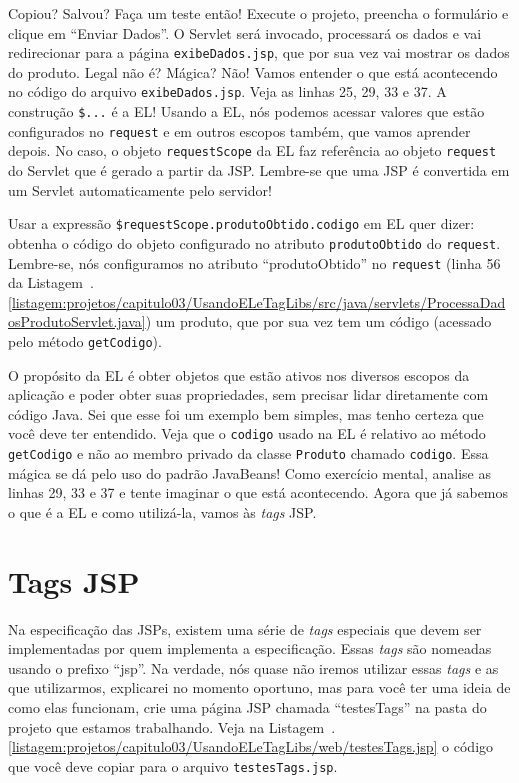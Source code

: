 
Copiou? Salvou? Faça um teste então! Execute o projeto, preencha o formulário e clique em ``Enviar Dados''. O Servlet será invocado, processará os dados e vai redirecionar para a página \texttt{exibeDados.jsp}, que por sua vez vai mostrar os dados do produto. Legal não é? Mágica? Não! Vamos entender o que está acontecendo no código do arquivo \texttt{exibeDados.jsp}. Veja as linhas 25, 29, 33 e 37. A construção \texttt{\${...}} é a EL! Usando a EL, nós podemos acessar valores que estão configurados no \texttt{request} e em outros escopos também, que vamos aprender depois. No caso, o objeto \texttt{requestScope} da EL faz referência ao objeto \texttt{request} do Servlet que é gerado a partir da JSP. Lembre-se que uma JSP é convertida em um Servlet automaticamente pelo servidor!

Usar a expressão \texttt{\${requestScope.produtoObtido.codigo}} em EL quer dizer: obtenha o código do objeto configurado no atributo \texttt{produtoObtido} do \texttt{request}. Lembre-se, nós configuramos no atributo ``produtoObtido'' no \texttt{request} (linha 56 da Listagem~\thechapter.\ref{listagem:projetos/capitulo03/UsandoELeTagLibs/src/java/servlets/ProcessaDadosProdutoServlet.java}) um produto, que por sua vez tem um código (acessado pelo método \texttt{getCodigo}).

O propósito da EL é obter objetos que estão ativos nos diversos escopos da aplicação e poder obter suas propriedades, sem precisar lidar diretamente com código Java. Sei que esse foi um exemplo bem simples, mas tenho certeza que você deve ter entendido. Veja que o \texttt{codigo} usado na EL é relativo ao método \texttt{getCodigo} e não ao membro privado da classe \texttt{Produto} chamado \texttt{codigo}. Essa mágica se dá pelo uso do padrão JavaBeans! Como exercício mental, analise as linhas 29, 33 e 37 e tente imaginar o que está acontecendo. Agora que já sabemos o que é a EL e como utilizá-la, vamos às \textit{tags} JSP.


\section{Tags JSP}

Na especificação das JSPs, existem uma série de \textit{tags} especiais que devem ser implementadas por quem implementa a especificação. Essas \textit{tags} são nomeadas usando o prefixo ``jsp''. Na verdade, nós quase não iremos utilizar essas \textit{tags} e as que utilizarmos, explicarei no momento oportuno, mas para você ter uma ideia de como elas funcionam, crie uma página JSP chamada ``testesTags'' na pasta  do projeto que estamos trabalhando. Veja na Listagem~\thechapter.\ref{listagem:projetos/capitulo03/UsandoELeTagLibs/web/testesTags.jsp} o código que você deve copiar para o arquivo \texttt{testesTags.jsp}. 

